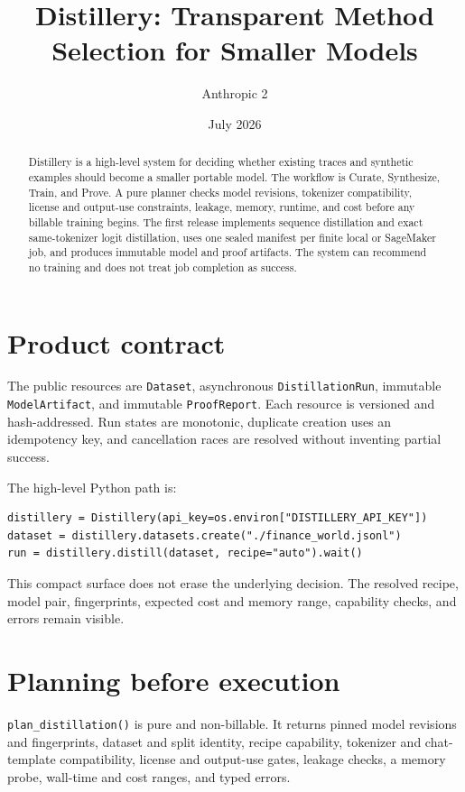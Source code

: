 \documentclass[11pt]{article}
\title{Distillery: Transparent Method Selection for Smaller Models}
\author{Anthropic 2}
\date{July 2026}
\begin{document}
\maketitle

\begin{abstract}
Distillery is a high-level system for deciding whether existing traces and synthetic examples should become a smaller portable model. The workflow is Curate, Synthesize, Train, and Prove. A pure planner checks model revisions, tokenizer compatibility, license and output-use constraints, leakage, memory, runtime, and cost before any billable training begins. The first release implements sequence distillation and exact same-tokenizer logit distillation, uses one sealed manifest per finite local or SageMaker job, and produces immutable model and proof artifacts. The system can recommend no training and does not treat job completion as success.
\end{abstract}

\section{Product contract}
The public resources are \texttt{Dataset}, asynchronous \texttt{DistillationRun}, immutable \texttt{ModelArtifact}, and immutable \texttt{ProofReport}. Each resource is versioned and hash-addressed. Run states are monotonic, duplicate creation uses an idempotency key, and cancellation races are resolved without inventing partial success.

The high-level Python path is:
\begin{verbatim}
distillery = Distillery(api_key=os.environ["DISTILLERY_API_KEY"])
dataset = distillery.datasets.create("./finance_world.jsonl")
run = distillery.distill(dataset, recipe="auto").wait()
\end{verbatim}
This compact surface does not erase the underlying decision. The resolved recipe, model pair, fingerprints, expected cost and memory range, capability checks, and errors remain visible.

\section{Planning before execution}
\texttt{plan\_distillation()} is pure and non-billable. It returns pinned model revisions and fingerprints, dataset and split identity, recipe capability, tokenizer and chat-template compatibility, license and output-use gates, leakage checks, a memory probe, wall-time and cost ranges, and typed errors.
\end{document}
